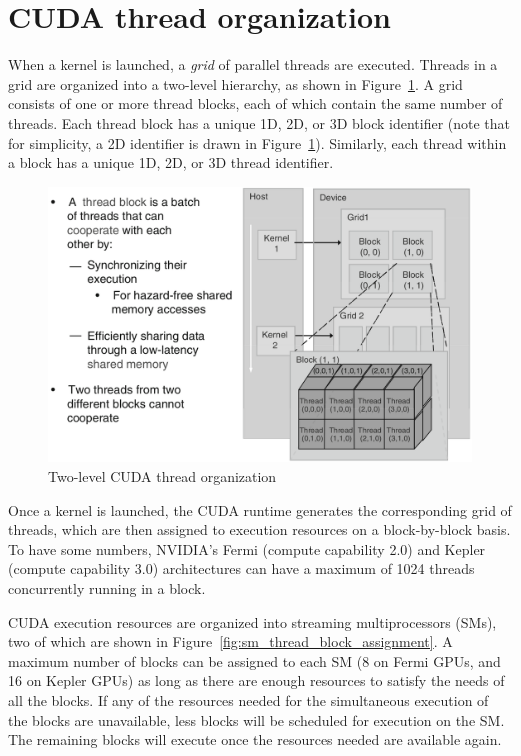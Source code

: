 \documentclass[10pt, a4paper]{report}
\begin{document}
\section{CUDA thread organization}
\label{sec:cuda_thread_organization}
When a kernel is launched, a \emph{grid} of parallel threads are executed.
Threads in a grid are organized into a two-level hierarchy, as shown in
Figure~\ref{fig:cuda_thread_organization}.
A grid consists of one or more thread blocks, each of which contain the same
number of threads.
Each thread block has a unique 1D, 2D, or 3D block identifier (note that for
simplicity, a 2D identifier is drawn in
Figure~\ref{fig:cuda_thread_organization}).
Similarly, each thread within a block has a unique 1D, 2D, or 3D thread
identifier.

\begin{figure}[h]
\centering
\includegraphics[scale=0.27]{figs/cuda_thread_organization}
\caption{Two-level CUDA thread organization}
\label{fig:cuda_thread_organization}
\end{figure}

Once a kernel is launched, the CUDA runtime generates the corresponding grid of
threads, which are then assigned to execution resources on a block-by-block
basis.
To have some numbers, NVIDIA's Fermi (compute capability 2.0) and Kepler
(compute capability 3.0) architectures can have a maximum of 1024 threads
concurrently running in a block.

CUDA execution resources are organized into streaming multiprocessors (SMs), two
of which are shown in Figure~\ref{fig:sm_thread_block_assignment}.
A maximum number of blocks can be assigned to each SM (8 on Fermi GPUs, and 16
on Kepler GPUs) as long as there are enough resources to satisfy the needs of
all the blocks.
If any of the resources needed for the simultaneous execution of the blocks are
unavailable, less blocks will be scheduled for execution on the SM.
The remaining blocks will execute once the resources needed are available again.
\end{document}
